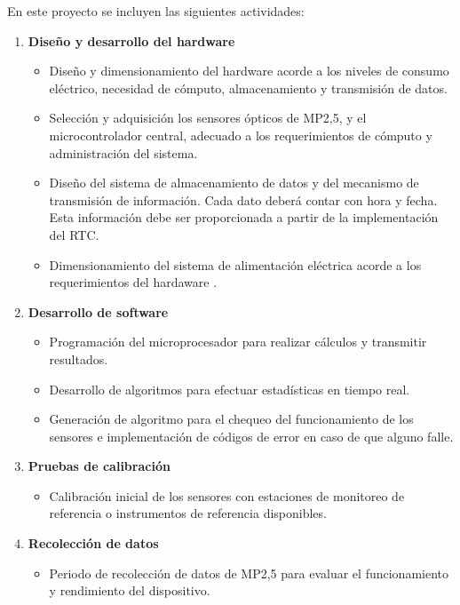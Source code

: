 En este proyecto se incluyen las siguientes actividades:

\begin{enumerate}[label=\alph*)]
	\item \textbf{Diseño y desarrollo del hardware}
	\begin{itemize}
		\item Diseño y dimensionamiento del hardware acorde a los niveles de consumo eléctrico, necesidad de cómputo, almacenamiento y transmisión de datos.  
		\item Selección y adquisición los sensores ópticos de MP2,5, y el microcontrolador central, adecuado a los requerimientos de cómputo y administración del sistema.
		\item Diseño del sistema de almacenamiento de datos y del mecanismo de transmisión de información. Cada dato deberá contar con hora y fecha. Esta información debe ser proporcionada a partir de la implementación del RTC.
		\item Dimensionamiento del sistema de alimentación eléctrica acorde a los requerimientos del hardaware .
	\end{itemize}
	
	\item \textbf{Desarrollo de software}
	\begin{itemize}
		\item Programación del microprocesador para realizar cálculos y transmitir resultados.
		\item Desarrollo de algoritmos para efectuar estadísticas en tiempo real.
		\item Generación de algoritmo para el chequeo del funcionamiento de los sensores e implementación de códigos de error en caso de que alguno falle.
	\end{itemize}
	
	\item \textbf{Pruebas de calibración}
	\begin{itemize}
		\item Calibración inicial de los sensores con estaciones de monitoreo de referencia o instrumentos de referencia disponibles.
	\end{itemize}
	
	\item \textbf{Recolección de datos}
	\begin{itemize}
		\item Periodo de recolección de datos de MP2,5 para evaluar el funcionamiento y rendimiento del dispositivo.
	\end{itemize}
	

\end{enumerate}
